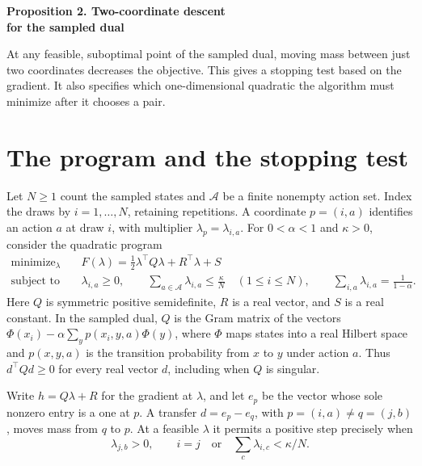 \documentclass[12pt,a4paper]{article}
\begin{document}
{\LARGE\bfseries Proposition 2. Two-coordinate descent\\[2pt] for the sampled dual\par}
\medskip
At any feasible, suboptimal point of the sampled dual, moving mass between
just two coordinates decreases the objective. This gives a stopping
test based on the gradient. It also specifies which one-dimensional
quadratic the algorithm must minimize after it chooses a pair.

\section*{The program and the stopping test}
Let \(N\ge1\) count the sampled states and \(\mathcal A\) be a finite
nonempty action set. Index the draws by \(i=1,\ldots,N\), retaining
repetitions. A coordinate \(p=(i,a)\) identifies an action \(a\) at draw
\(i\), with multiplier \(\lambda_p=\lambda_{i,a}\). For \(0<\alpha<1\) and
\(\kappa>0\), consider the quadratic program
\begin{equation}
 \begin{aligned}
 \operatorname{minimize}_{\lambda}\quad&
 F(\lambda)=\tfrac12\lambda^\top Q\lambda+R^\top\lambda+S\\
 \text{subject to}\quad&
 \lambda_{i,a}\ge0,\qquad
 \sum_{a\in\mathcal A}\lambda_{i,a}\le\frac{\kappa}{N}\quad(1\le i\le N),\qquad
 \sum_{i,a}\lambda_{i,a}=\frac{1}{1-\alpha}.
 \end{aligned}
 \tag{9}\label{eq:qp}
\end{equation}
Here \(Q\) is symmetric positive semidefinite, \(R\) is a real vector,
and \(S\) is a real constant. In the sampled dual, \(Q\) is the Gram
matrix of the vectors
\(\Phi(x_i)-\alpha\sum_y p(x_i,y,a)\Phi(y)\), where \(\Phi\) maps states
into a real Hilbert space and \(p(x,y,a)\) is the transition probability
from \(x\) to \(y\) under action \(a\). Thus \(d^\top Qd\ge0\) for every
real vector \(d\), including when \(Q\) is singular.

Write \(h=Q\lambda+R\) for the gradient at \(\lambda\), and let \(e_p\)
be the vector whose sole nonzero entry is a one at \(p\). A transfer
\(d=e_p-e_q\), with \(p=(i,a)\ne q=(j,b)\), moves mass from \(q\) to \(p\).
At a feasible \(\lambda\) it permits a positive step precisely when
\begin{equation}
 \lambda_{j,b}>0,\qquad
 i=j\quad\text{or}\quad\sum_c\lambda_{i,c}<\kappa/N .
 \tag{L}\label{eq:legal}
\end{equation}
\end{document}

